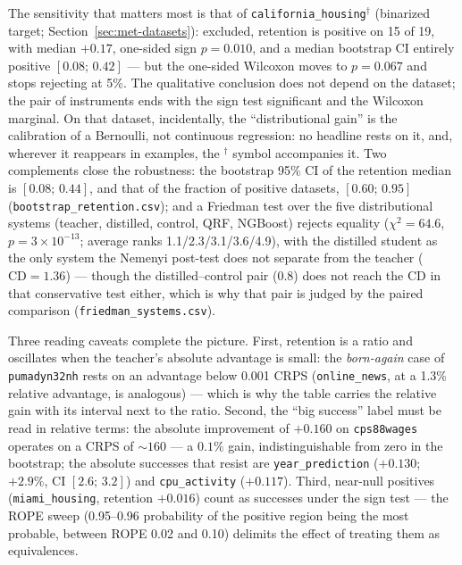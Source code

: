 The sensitivity that matters most is that of
\texttt{california\_housing}$^\dagger$ (binarized target;
Section~\ref{sec:met-datasets}): excluded, retention is positive on
15 of 19, with median $+0.17$, one-sided sign $p=0.010$, and a median
bootstrap CI entirely positive $[0.08;\,0.42]$ --- but the one-sided
Wilcoxon moves to $p=0.067$ and stops rejecting at 5\%. The
qualitative conclusion does not depend on the dataset; the pair of
instruments ends with the sign test significant and the Wilcoxon
marginal. On that dataset, incidentally, the ``distributional gain''
is the calibration of a Bernoulli, not continuous regression: no
headline rests on it, and, wherever it reappears in examples, the
$^\dagger$ symbol accompanies it. Two complements close the
robustness: the bootstrap 95\% CI of the retention median is
$[0.08;\,0.44]$, and that of the fraction of positive datasets,
$[0.60;\,0.95]$
(\texttt{bootstrap\_\allowbreak retention.csv}); and a Friedman test
over the five distributional systems (teacher, distilled, control,
QRF, NGBoost) rejects equality ($\chi^2{=}64.6$,
$p{=}3{\times}10^{-13}$; average ranks 1.1/2.3/3.1/3.6/4.9), with
the distilled student as the only system the Nemenyi post-test does
not separate from the teacher ($\mathrm{CD}{=}1.36$) --- though the
distilled--control pair (0.8) does not reach the CD in that
conservative test either, which is why that pair is judged by the
paired comparison (\texttt{friedman\_\allowbreak systems.csv}).

Three reading caveats complete the picture. First, retention is a
ratio and oscillates when the teacher's absolute advantage is small: the
\emph{born-again} case of \texttt{pumadyn32nh} rests on an advantage
below 0.001 CRPS (\texttt{online\_news}, at a 1.3\% relative
advantage, is analogous) --- which is why
the table carries the relative gain with its interval next to the
ratio. Second, the ``big success'' label must be read in relative terms:
the absolute improvement of $+0.160$ on \texttt{cps88wages} operates
on a CRPS of ${\sim}160$ --- a $0.1\%$ gain, indistinguishable from
zero in the bootstrap; the absolute successes that resist are
\texttt{year\_\allowbreak prediction} ($+0.130$; $+2.9\%$, CI
$[2.6;\,3.2]$) and \texttt{cpu\_activity} ($+0.117$). Third,
near-null positives (\texttt{miami\_housing}, retention $+0.016$)
count as successes under the sign test --- the ROPE sweep (0.95--0.96
probability of the positive region being the most probable, between
ROPE 0.02 and 0.10) delimits the
effect of treating them as equivalences.

